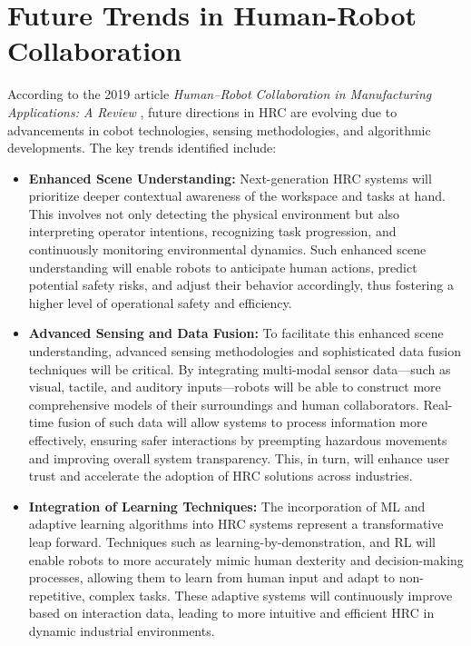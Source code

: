 

\section{Future Trends in Human-Robot Collaboration}

According to the 2019 article \textit{Human–Robot Collaboration in Manufacturing Applications: A Review} \cite{robotics8040100}, future directions in 
\ac{HRC} are evolving due to advancements in cobot technologies, sensing methodologies, and algorithmic developments. The key trends identified include:

\begin{itemize}
    \item \textbf{Enhanced Scene Understanding:} Next-generation \ac{HRC} systems will prioritize deeper contextual awareness of the workspace and tasks at hand. This involves not only detecting the physical environment but also interpreting operator intentions, recognizing task progression, and continuously monitoring environmental dynamics. Such enhanced scene understanding will enable robots to anticipate human actions, predict potential safety risks, and adjust their behavior accordingly, thus fostering a higher level of operational safety and efficiency.

    \item \textbf{Advanced Sensing and Data Fusion:} To facilitate this enhanced scene understanding, advanced sensing methodologies and sophisticated data fusion techniques will be critical. By integrating multi-modal sensor data—such as visual, tactile, and auditory inputs—robots will be able to construct more comprehensive models of their surroundings and human collaborators. Real-time fusion of such data will allow systems to process information more effectively, ensuring safer interactions by preempting hazardous movements and improving overall system transparency. This, in turn, will enhance user trust and accelerate the adoption of HRC solutions across industries.

    \item \textbf{Integration of Learning Techniques:} 
    The incorporation of \ac{ML} and adaptive learning algorithms into \ac{HRC} systems represent a transformative leap forward. Techniques such as learning-by-demonstration, and \ac{RL} will enable robots to more accurately mimic human dexterity and decision-making processes, allowing them to learn from human input and adapt to non-repetitive, complex tasks. These adaptive systems will continuously improve based on interaction data, leading to more intuitive and efficient \ac{HRC} in dynamic industrial environments.


\end{itemize}
